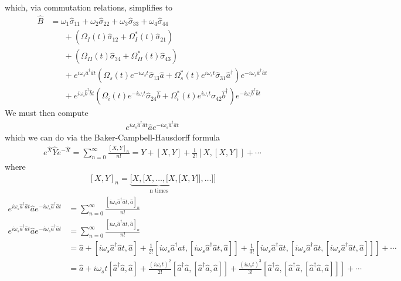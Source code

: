 \documentclass[aps,pra,showpacs,amsmath,amssymb,nofootinbib,longbibliography,superscriptaddress
]{revtex4-1}
\theoremstyle{definition}
\theoremstyle{remark}
\newcommand{\0}{\hat{0}}
\begin{document}
which, via commutation relations, simplifies to 
\begin{align}\label{Unsimplified_B_eq}
    \hat{B}
    &=
    \omega_1 \hat{\sigma}_{11} +
    \omega_2 \hat{\sigma}_{22} +
    \omega_3 \hat{\sigma}_{33} +
    \omega_4 \hat{\sigma}_{44} \nonumber \\
    &\;\;\;\;\;\;+
    \left(
        \Omega_{I}(t) \hat{\sigma}_{12} +
        \Omega_{I}^*(t) \hat{\sigma}_{21}
    \right)\nonumber \\
    &\;\;\;\;\;\;+
    \left(
        \Omega_{II}(t) \hat{\sigma}_{34} +
        \Omega_{II}^*(t) \hat{\sigma}_{43}
    \right) \nonumber \\
    &\;\;\;\;\;\;+
    e^{i\omega_s \hat{a}^{\dagger} \hat{a}t}
    \left(
        \Omega_{s}(t) e^{-i \omega_s t} \hat{\sigma}_{13} \hat{a} +
        \Omega_{s}^*(t) e^{i \omega_s t} \hat{\sigma}_{31} \hat{a}^{\dagger}
    \right)
    e^{-i\omega_s \hat{a}^{\dagger} \hat{a}t}\nonumber \\
    &\;\;\;\;\;\;+
    e^{i \omega_i \hat{b}^{\dagger} \hat{b} t}
    \left(
        \Omega_{i}(t) e^{-i\omega_i t} \hat{\sigma}_{24} \hat{b} +
        \Omega_{i}^*(t) e^{i\omega_i t} \hat{\sigma}_{42} \hat{b}^{\dagger}
    \right) e^{-i \omega_i \hat{b}^{\dagger} \hat{b} t}
\end{align}
We must then compute
\begin{align}
    e^{i\omega_s \hat{a}^{\dagger} \hat{a}t} \hat{a} e^{-i\omega_s \hat{a}^{\dagger} \hat{a}t}
\end{align}
which we can do via the Baker-Campbell-Hausdorff formula
\begin{align}
    e^{\hat{X}} \hat{Y} e^{-\hat{X}} = \sum_{n=0}^{\infty} \frac{{[X, Y]}_n}{n!} = Y + [X, Y] + \frac{1}{2!}[X, [X, Y]] + \cdots
\end{align}
where
\begin{align}
    {[X, Y]}_n = \underbrace{[X, [X, \ldots, [X, [X}_{\text{n times}}, Y]], \ldots]]
\end{align}
\begin{align}
    e^{i\omega_s \hat{a}^{\dagger} \hat{a}t} \hat{a} e^{-i\omega_s \hat{a}^{\dagger} \hat{a}t} &= \sum_{n=0}^{\infty} \frac{{[i\omega_s \hat{a}^{\dagger} \hat{a}t, \hat{a}]}_n}{n!} \nonumber \\
    e^{i\omega_s \hat{a}^{\dagger} \hat{a}t} \hat{a} e^{-i\omega_s \hat{a}^{\dagger} \hat{a}t} &= \sum_{n=0}^{\infty} \frac{{[i\omega_s \hat{a}^{\dagger} \hat{a}t, \hat{a}]}_n}{n!} \nonumber \\
    &= \hat{a} + [i\omega_s \hat{a}^{\dagger} \hat{a}t, \hat{a}] + \frac{1}{2!}[i\omega_s \hat{a}^{\dagger} \hat{a}t, [i\omega_s \hat{a}^{\dagger} \hat{a}t, \hat{a}]] + \frac{1}{3!}[i\omega_s \hat{a}^{\dagger} \hat{a}t, [i\omega_s \hat{a}^{\dagger} \hat{a}t, [i\omega_s \hat{a}^{\dagger} \hat{a}t, \hat{a}]]] + \cdots \nonumber \\
    &= \hat{a} + i \omega_s t [\hat{a}^{\dagger} \hat{a}, \hat{a}] + \frac{(i \omega_s t)^2}{2!} [\hat{a}^{\dagger} \hat{a}, [\hat{a}^{\dagger} \hat{a}, \hat{a}]] + \frac{(i \omega_s t)^3}{3!}[\hat{a}^{\dagger} \hat{a}, [\hat{a}^{\dagger} \hat{a}, [\hat{a}^{\dagger} \hat{a}, \hat{a}]]] + \cdots
\end{align}
\end{document}
